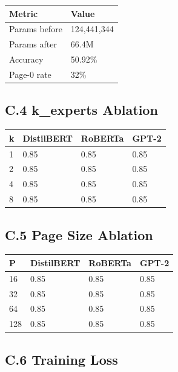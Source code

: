 \begin{table}[H]
\centering
\small
\begin{tabular}{ll}
\toprule
\textbf{Metric} & \textbf{Value} \\
\midrule
Params before & 124,441,344 \\
Params after & 66.4M \\
Accuracy & 50.92\% \\
Page-0 rate & 32\% \\
\bottomrule
\end{tabular}
\end{table}

\subsection{C.4 k\_experts Ablation}

\begin{table}[H]
\centering
\small
\begin{tabular}{llll}
\toprule
\textbf{k} & \textbf{DistilBERT} & \textbf{RoBERTa} & \textbf{GPT-2} \\
\midrule
1 & 0.85 & 0.85 & 0.85 \\
2 & 0.85 & 0.85 & 0.85 \\
4 & 0.85 & 0.85 & 0.85 \\
8 & 0.85 & 0.85 & 0.85 \\
\bottomrule
\end{tabular}
\end{table}

\subsection{C.5 Page Size Ablation}

\begin{table}[H]
\centering
\small
\begin{tabular}{llll}
\toprule
\textbf{P} & \textbf{DistilBERT} & \textbf{RoBERTa} & \textbf{GPT-2} \\
\midrule
16 & 0.85 & 0.85 & 0.85 \\
32 & 0.85 & 0.85 & 0.85 \\
64 & 0.85 & 0.85 & 0.85 \\
128 & 0.85 & 0.85 & 0.85 \\
\bottomrule
\end{tabular}
\end{table}

\subsection{C.6 Training Loss}

